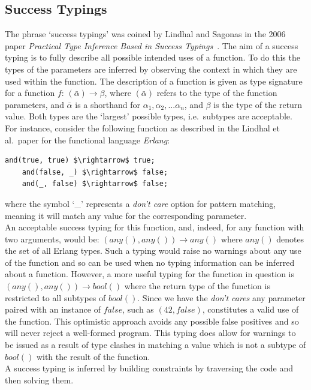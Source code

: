 \documentclass[12pt, titlepage]{article}
\begin{document}
\subsection{Success Typings}
The phrase `success typings' was coined by Lindhal and Sagonas in the 2006 paper \textit{Practical Type Inference Based in Success Typings}~\cite{lindhal06}. The aim of a success typing is to fully describe all possible intended uses of a function. To do this the types of the parameters are inferred by observing the context in which they are used within the function. The description of a function is given as type signature for a function $f$: $(\bar{\alpha}) \rightarrow \beta$, where $(\bar{\alpha})$ refers to the type of the function parameters, and $\bar{\alpha}$ is a shorthand for $\alpha_1, \alpha_2,...\alpha_n$, and $\beta$ is the type of the return value. Both types are the `largest' possible types, i.e.\ subtypes are acceptable. For instance, consider the following function as described in the Lindhal et al.\ paper for the functional language \textit{Erlang}:
\begin{lstlisting}[mathescape]
	and(true, true) $\rightarrow$ true;
	and(false, _) $\rightarrow$ false;
	and(_, false) $\rightarrow$ false;
\end{lstlisting}
where the symbol `\_' represents a \textit{don't care} option for pattern matching, meaning it will match any value for the corresponding parameter. \\
\indent An acceptable success typing for this function, and, indeed, for any function with two arguments, would be: $(any(), any()) \rightarrow any()$ where $any()$ denotes the set of all Erlang types. Such a typing would raise no warnings about any use of the function and so can be used when no typing information can be inferred about a function. However, a more useful typing for the function in question is $(any(), any()) \rightarrow bool()$ where the return type of the function is restricted to all subtypes of $bool()$. Since we have the \textit{don't cares} any parameter paired with an instance of $false$, such as $(42, false)$, constitutes a valid use of the function. This optimistic approach avoids any possible false positives and so will never reject a well-formed program. This typing does allow for warnings to be issued as a result of type clashes in matching a value which is not a subtype of $bool()$ with the result of the function. \\
\indent A success typing is inferred by building constraints by traversing the code and then solving them. \\
\end{document}

